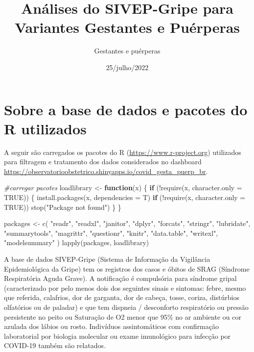 \documentclass[
]{article}
\title{Análises do SIVEP-Gripe para Variantes Gestantes e Puérperas}
\author{Gestantes e puérperas}
\date{25/julho/2022}
\newenvironment{Shaded}{\begin{snugshade}}{\end{snugshade}}
\newcommand{\AttributeTok}[1]{\textcolor[rgb]{0.77,0.63,0.00}{#1}}
\newcommand{\CommentTok}[1]{\textcolor[rgb]{0.56,0.35,0.01}{\textit{#1}}}
\newcommand{\ConstantTok}[1]{\textcolor[rgb]{0.00,0.00,0.00}{#1}}
\newcommand{\ControlFlowTok}[1]{\textcolor[rgb]{0.13,0.29,0.53}{\textbf{#1}}}
\newcommand{\FunctionTok}[1]{\textcolor[rgb]{0.00,0.00,0.00}{#1}}
\newcommand{\NormalTok}[1]{#1}
\newcommand{\OtherTok}[1]{\textcolor[rgb]{0.56,0.35,0.01}{#1}}
\newcommand{\SpecialCharTok}[1]{\textcolor[rgb]{0.00,0.00,0.00}{#1}}
\newcommand{\StringTok}[1]{\textcolor[rgb]{0.31,0.60,0.02}{#1}}
\begin{document}
\maketitle

\hypertarget{sobre-a-base-de-dados-e-pacotes-do-r-utilizados}{%
\section{Sobre a base de dados e pacotes do R
utilizados}\label{sobre-a-base-de-dados-e-pacotes-do-r-utilizados}}

A seguir são carregados os pacotes do R
(\url{https://www.r-project.org}) utilizados para filtragem e tratamento
dos dados considerados no dashboard
\url{https://observatorioobstetrico.shinyapps.io/covid_gesta_puerp_br}.

\begin{Shaded}
\begin{Highlighting}[]
\CommentTok{\#carregar pacotes}
\NormalTok{loadlibrary }\OtherTok{\textless{}{-}} \ControlFlowTok{function}\NormalTok{(x) \{}
  \ControlFlowTok{if}\NormalTok{ (}\SpecialCharTok{!}\FunctionTok{require}\NormalTok{(x, }\AttributeTok{character.only =} \ConstantTok{TRUE}\NormalTok{)) \{}
    \FunctionTok{install.packages}\NormalTok{(x, }\AttributeTok{dependencies =}\NormalTok{ T)}
    \ControlFlowTok{if}\NormalTok{ (}\SpecialCharTok{!}\FunctionTok{require}\NormalTok{(x, }\AttributeTok{character.only =} \ConstantTok{TRUE}\NormalTok{))}
      \FunctionTok{stop}\NormalTok{(}\StringTok{"Package not found"}\NormalTok{)}
\NormalTok{  \}}
\NormalTok{\}}

\NormalTok{packages }\OtherTok{\textless{}{-}}
  \FunctionTok{c}\NormalTok{(}
    \StringTok{"readr"}\NormalTok{,}
    \StringTok{"readxl"}\NormalTok{,}
    \StringTok{"janitor"}\NormalTok{,}
    \StringTok{"dplyr"}\NormalTok{,}
    \StringTok{"forcats"}\NormalTok{,}
    \StringTok{"stringr"}\NormalTok{,}
    \StringTok{"lubridate"}\NormalTok{,}
    \StringTok{"summarytools"}\NormalTok{,}
    \StringTok{"magrittr"}\NormalTok{,}
    \StringTok{"questionr"}\NormalTok{,}
    \StringTok{"knitr"}\NormalTok{,}
    \StringTok{"data.table"}\NormalTok{,}
    \StringTok{"writexl"}\NormalTok{,}
    \StringTok{"modelsummary"}
\NormalTok{  )}
\FunctionTok{lapply}\NormalTok{(packages, loadlibrary)}
\end{Highlighting}
\end{Shaded}

A base de dados SIVEP-Gripe (Sistema de Informação da Vigilância
Epidemiológica da Gripe) tem os registros dos casos e óbitos de SRAG
(Síndrome Respiratória Aguda Grave). A notificação é compulsória para
síndrome gripal (caracterizado por pelo menos dois dos seguintes sinais
e sintomas: febre, mesmo que referida, calafrios, dor de garganta, dor
de cabeça, tosse, coriza, distúrbios olfatórios ou de paladar) e que tem
dispneia / desconforto respiratório ou pressão persistente no peito ou
Saturação de O2 menor que 95\% no ar ambiente ou cor azulada dos lábios
ou rosto. Indivíduos assintomáticos com confirmação laboratorial por
biologia molecular ou exame imunológico para infecção por COVID-19
também são relatados.
\end{document}
